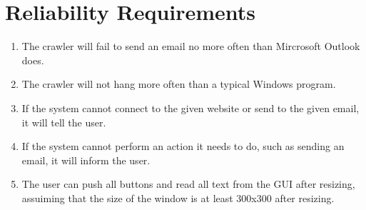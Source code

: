 \section{Reliability Requirements}
\begin{enumerate}
\item The crawler will fail to send an email no more often than Mircrosoft Outlook does.
\item The crawler will not hang more often than a typical Windows program.
\item If the system cannot connect to the given website or send to the given email, it will tell the user.
\item If the system cannot perform an action it needs to do, such as sending an email, it will inform the user.
\item The user can push all buttons and read all text from the GUI after resizing, assuiming that the size of the window is at least 300x300 after resizing.
\end{enumerate}

